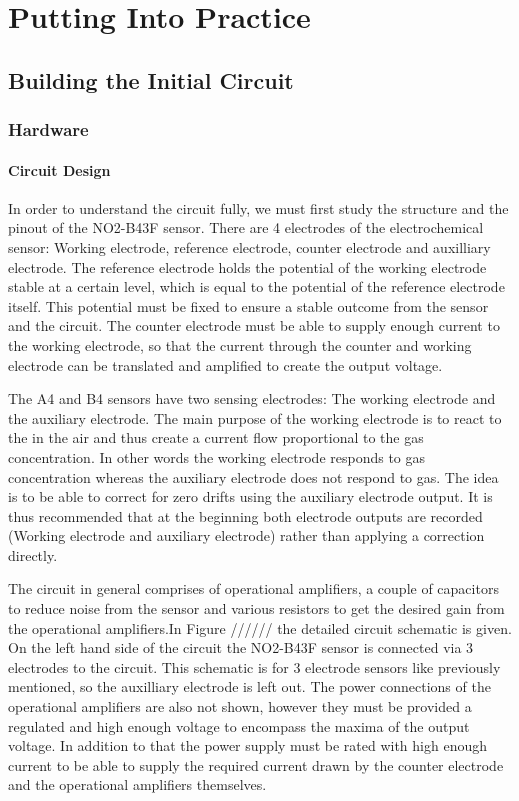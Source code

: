 \chapter{Putting Into Practice}

\section{Building the Initial Circuit}

\subsection{Hardware}
\subsubsection{Circuit Design}
In order to understand the circuit fully, we must first study the structure and the pinout of the NO2-B43F sensor. There are 4 electrodes of the electrochemical sensor: Working electrode, reference electrode, counter electrode and auxilliary electrode. The reference electrode holds the potential of the working electrode stable at a certain level, which is equal to the potential of the reference electrode itself. This potential must be fixed to ensure a stable outcome from the sensor and the circuit. The counter electrode must be able to supply enough current to the working electrode, so that the current through the counter and working electrode can be translated and amplified to create the output voltage.\par
The A4 and B4 sensors have two sensing electrodes: The working electrode and the auxiliary electrode. The main purpose of the working electrode is to react to the  in the air and thus create a current flow proportional to the gas concentration. In other words the working electrode responds to gas concentration whereas the auxiliary electrode does not respond to gas. The idea is to be able to correct for zero drifts using the auxiliary electrode output. It is thus recommended that at the beginning both electrode outputs are recorded (Working electrode and auxiliary electrode) rather than applying a correction directly.\par
The circuit in general comprises of operational amplifiers, a couple of capacitors to reduce noise from the sensor and various resistors to get the desired gain from the operational amplifiers.In Figure ////// the detailed circuit schematic is given. On the left hand side of the circuit the NO2-B43F sensor is connected via 3 electrodes to the circuit. This schematic is for 3 electrode sensors like previously mentioned, so the auxilliary electrode is left out. The power connections of the operational amplifiers are also not shown, however they must be provided a regulated and high enough voltage to encompass the maxima of the output voltage. In addition to that the power supply must be rated with high enough current to be able to supply the required current drawn by the counter electrode and the operational amplifiers themselves.\par

